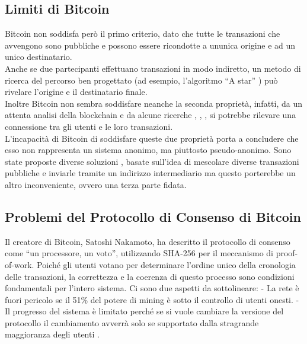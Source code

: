 \subsection{Limiti di Bitcoin}\label{limiti-di-bitcoin}

Bitcoin non soddisfa però il primo criterio, dato che tutte le
transazioni che avvengono sono pubbliche e possono essere ricondotte a
un\textquotesingle unica origine e ad un unico destinatario.\\
Anche se due partecipanti effettuano transazioni in modo indiretto, un
metodo di ricerca del percorso ben progettato (ad esempio, l'algoritmo
``A star'' \cite{hart1968formal}) può rivelare l'origine e il destinatario
finale.\\
Inoltre Bitcoin non sembra soddisfare neanche la seconda proprietà,
infatti, da un attenta analisi della blockchain e da alcune ricerche
\cite{reid2013analysis}, \cite{analysis_bitcoin}, \cite{ron2013quantitative}, si potrebbe rilevare una
connessione tra gli utenti e le loro transazioni.\\
L'incapacità di Bitcoin di soddisfare queste due proprietà porta a
concludere che esso non rappresenta un sistema anonimo, ma piuttosto
pseudo-anonimo. Sono state proposte diverse soluzioni \cite{mixing_services},
\cite{secure_multiparty} basate sull'idea di mescolare diverse transazioni pubbliche
e inviarle tramite un indirizzo intermediario ma questo porterebbe un
altro inconveniente, ovvero una terza parte fidata.

\subsection{Problemi del Protocollo di Consenso di
Bitcoin}\label{problemi-del-protocollo-di-consenso-di-bitcoin}

Il creatore di Bitcoin, Satoshi Nakamoto, ha descritto il protocollo di
consenso come ``un processore, un voto'', utilizzando SHA-256 per il
meccanismo di proof-of-work. Poiché gli utenti votano per determinare
l'ordine unico della cronologia delle transazioni, la correttezza e la
coerenza di questo processo sono condizioni fondamentali per l'intero
sistema. Ci sono due aspetti da sottolineare: - La rete è fuori pericolo
se il 51\% del potere di mining è sotto il controllo di utenti onesti. -
Il progresso del sistema è limitato perché se si vuole cambiare la
versione del protocollo il cambiamento avverrà solo se supportato dalla
stragrande maggioranza degli utenti \cite{bip_34}.

